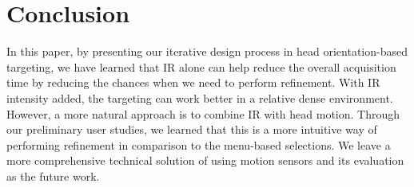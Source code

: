 
\section{Conclusion}
\label{sec:conclusion}

In this paper, by presenting our iterative design process in head orientation-based targeting, we have learned that IR alone can help reduce the overall acquisition time by reducing the chances when we need to perform refinement. With IR intensity added, the targeting can work better in a relative dense environment. However, a more natural approach is to combine IR with head motion. Through our preliminary user studies, we learned that this is a more intuitive way of performing refinement in comparison to the menu-based selections. We leave a more comprehensive technical solution of using motion sensors and its evaluation as the future work.

